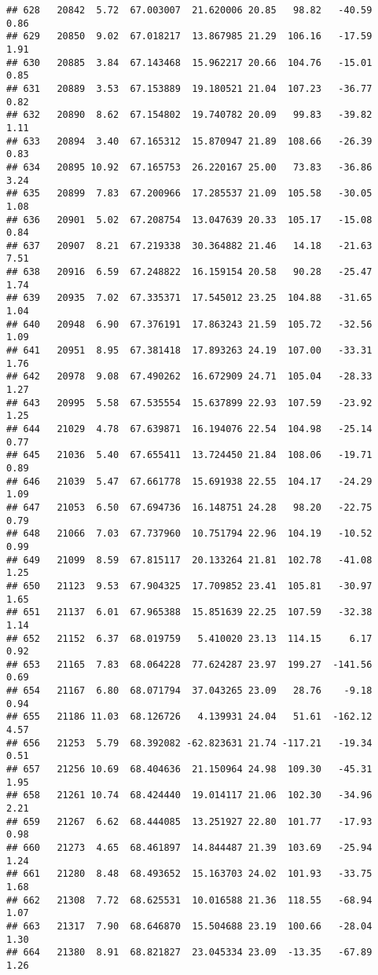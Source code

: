 \documentclass[]{article}
\begin{document}
\begin{verbatim}
## 628   20842  5.72  67.003007  21.620006 20.85   98.82   -40.59  0.86
## 629   20850  9.02  67.018217  13.867985 21.29  106.16   -17.59  1.91
## 630   20885  3.84  67.143468  15.962217 20.66  104.76   -15.01  0.85
## 631   20889  3.53  67.153889  19.180521 21.04  107.23   -36.77  0.82
## 632   20890  8.62  67.154802  19.740782 20.09   99.83   -39.82  1.11
## 633   20894  3.40  67.165312  15.870947 21.89  108.66   -26.39  0.83
## 634   20895 10.92  67.165753  26.220167 25.00   73.83   -36.86  3.24
## 635   20899  7.83  67.200966  17.285537 21.09  105.58   -30.05  1.08
## 636   20901  5.02  67.208754  13.047639 20.33  105.17   -15.08  0.84
## 637   20907  8.21  67.219338  30.364882 21.46   14.18   -21.63  7.51
## 638   20916  6.59  67.248822  16.159154 20.58   90.28   -25.47  1.74
## 639   20935  7.02  67.335371  17.545012 23.25  104.88   -31.65  1.04
## 640   20948  6.90  67.376191  17.863243 21.59  105.72   -32.56  1.09
## 641   20951  8.95  67.381418  17.893263 24.19  107.00   -33.31  1.76
## 642   20978  9.08  67.490262  16.672909 24.71  105.04   -28.33  1.27
## 643   20995  5.58  67.535554  15.637899 22.93  107.59   -23.92  1.25
## 644   21029  4.78  67.639871  16.194076 22.54  104.98   -25.14  0.77
## 645   21036  5.40  67.655411  13.724450 21.84  108.06   -19.71  0.89
## 646   21039  5.47  67.661778  15.691938 22.55  104.17   -24.29  1.09
## 647   21053  6.50  67.694736  16.148751 24.28   98.20   -22.75  0.79
## 648   21066  7.03  67.737960  10.751794 22.96  104.19   -10.52  0.99
## 649   21099  8.59  67.815117  20.133264 21.81  102.78   -41.08  1.25
## 650   21123  9.53  67.904325  17.709852 23.41  105.81   -30.97  1.65
## 651   21137  6.01  67.965388  15.851639 22.25  107.59   -32.38  1.14
## 652   21152  6.37  68.019759   5.410020 23.13  114.15     6.17  0.92
## 653   21165  7.83  68.064228  77.624287 23.97  199.27  -141.56  0.69
## 654   21167  6.80  68.071794  37.043265 23.09   28.76    -9.18  0.94
## 655   21186 11.03  68.126726   4.139931 24.04   51.61  -162.12  4.57
## 656   21253  5.79  68.392082 -62.823631 21.74 -117.21   -19.34  0.51
## 657   21256 10.69  68.404636  21.150964 24.98  109.30   -45.31  1.95
## 658   21261 10.74  68.424440  19.014117 21.06  102.30   -34.96  2.21
## 659   21267  6.62  68.444085  13.251927 22.80  101.77   -17.93  0.98
## 660   21273  4.65  68.461897  14.844487 21.39  103.69   -25.94  1.24
## 661   21280  8.48  68.493652  15.163703 24.02  101.93   -33.75  1.68
## 662   21308  7.72  68.625531  10.016588 21.36  118.55   -68.94  1.07
## 663   21317  7.90  68.646870  15.504688 23.19  100.66   -28.04  1.30
## 664   21380  8.91  68.821827  23.045334 23.09  -13.35   -67.89  1.26

\end{verbatim}
\end{document}

